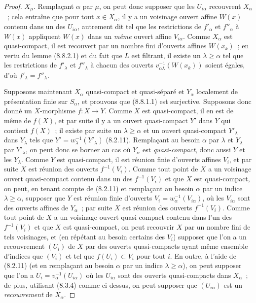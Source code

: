 \begin{proof}
$X_\mu$. Remplaçant $\alpha$ par $\mu$, on peut donc supposer que les
$U_{i\alpha}$ recouvrent $X_\alpha$~; cela entraîne que pour tout
$x\in X_\alpha$, il y a un voisinage ouvert affine $W(x)$ contenu dans un des
$U_{i\alpha}$, autrement dit tel que les restrictions de $f'_\alpha$ et
$f''_\alpha$ à $W(x)$ appliquent $W(x)$ dans un \emph{même} ouvert affine
$V_{i\alpha}$. Comme $X_\alpha$ est quasi-compact, il est recouvert par un
nombre fini d'ouverts affines $W(x_k)$~; en vertu du lemme (8.8.2.1) et du fait
que $L$ est filtrant, il existe un $\lambda\geq\alpha$ tel que les
restrictions de $f'_\lambda$ et $f''_\lambda$ à chacun des ouverts
$v_{\alpha\lambda}^{-1}(W(x_k))$ soient égales, d'où
$f'_\lambda=f''_\lambda$.

Supposons maintenant $X_\alpha$ quasi-compact et quasi-séparé et $Y_\alpha$
localement de présentation finie sur $S_\alpha$, et prouvons que (8.8.1.1) est
surjective. Supposons donc donné un $X$-morphisme $f:X\to Y$. Comme $X$ est
quasi-compact, il en est de même
de $f(X)$, et par suite il y a un ouvert quasi-compact $Y'$ dans $Y$ qui
contient $f(X)$~; il existe par suite un $\lambda\geq\alpha$ et un ouvert
quasi-compact $Y'_\lambda$ dans $Y_\lambda$ tels que
$Y'=w_\lambda^{-1}(Y'_\lambda)$ (8.2.11). Remplaçant au besoin $\alpha$ par
$\lambda$ et $Y_\lambda$ par $Y'_\lambda$, on peut donc se borner au cas où
$Y_\alpha$ est \emph{quasi-compact}, donc aussi $Y$ et les $Y_\lambda$. Comme $Y$ est
quasi-compact, il est réunion finie d'ouverts affines $V_i$, et par suite $X$
est réunion des ouverts $f^{-1}(V_i)$. Comme tout point de $X$ a un voisinage
ouvert quasi-compact contenu dans un des $f^{-1}(V_i)$ et que $X$ est
quasi-compact, on peut, en tenant compte de (8.2.11) et remplaçant au besoin
$\alpha$ par un indice $\lambda\geq\alpha$, supposer que $Y$ est réunion finie
d'ouverts $V_i=w_\alpha^{-1}(V_{i\alpha})$, où les $V_{i\alpha}$ sont des
ouverts affines de $Y_\alpha$~; par suite $X$ est réunion des ouverts
$f^{-1}(V_i)$. Comme tout point de $X$ a un voisinage ouvert quasi-compact
contenu dans l'un des $f^{-1}(V_i)$ et que $X$ est quasi-compact, on peut
recouvrir $X$ par un nombre fini de tels voisinages, et (en répétant au besoin
certains des $V_i$) supposer que l'on a un recouvrement $(U_i)$ de $X$ par des
ouverts quasi-compacts ayant même ensemble d'indices que $(V_i)$ et tel que
$f(U_i)\subset V_i$ pour tout $i$. En outre, à l'aide de (8.2.11) (et en
remplaçant au besoin $\alpha$ par un indice $\lambda\geq\alpha$), on peut
supposer que l'on a $U_i=v_\alpha^{-1}(U_{i\alpha})$ où les $U_{i\alpha}$ sont
des ouverts quasi-compacts dans $X_\alpha$~; de plus, utilisant (8.3.4) comme
ci-dessus, on peut supposer que $(U_{i\alpha})$ est un \emph{recouvrement} de
$X_\alpha$.


\end{proof}
